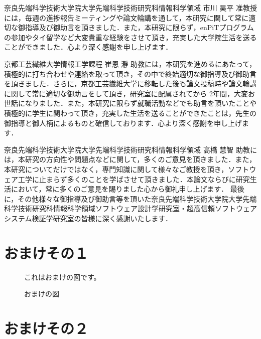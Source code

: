\documentclass[12pt]{jarticle} %
\begin{document}
奈良先端科学技術大学院大学先端科学技術研究科情報科学領域 市川 昊平 准教授には，毎週の進捗報告ミーティングや論文輪講を通して，本研究に関して常に適切な御指導及び御助言を頂きました．また，本研究に限らず，enPiTプログラムの参加やタイ留学など大変貴重な経験をさせて頂き，充実した大学院生活を送ることができました．心より深く感謝を申し上げます．

京都工芸繊維大学情報工学課程 崔恩 瀞 助教には，本研究を進めるにあたって，積極的に打ち合わせや連絡を取って頂き，その中で終始適切な御指導及び御助言を頂きました．さらに，京都工芸繊維大学に移転した後も論文投稿時や論文輪講に関して常に適切な御助言をして頂き，研究室に配属されてから 2年間，大変お世話になりました．また，本研究に限らず就職活動などでも助言を頂いたことや積極的に学生に関わって頂き，充実した生活を送ることができたことは，先生の御指導と御人柄によるものと確信しております．心より深く感謝を申し上げます．

奈良先端科学技術大学院大学先端科学技術研究科情報科学領域 高橋 慧智 助教には，本研究の方向性や問題点などに関して，多くのご意見を頂きました．また，本研究についてだけではなく，専門知識に関して様々なご教授を頂き，ソフトウェア工学に止まらず多くのことを学ばさせて頂きました．本論文ならびに研究生活において，常に多くのご意見を賜りました心から御礼申し上げます．
最後に，その他様々な御指導及び御助言等を頂いた奈良先端科学技術大学院大学先端科学技術研究科情報科学領域ソフトウェア設計学研究室・超高信頼ソフトウェアシステム検証学研究室の皆様に深く感謝いたします．


%
%
\newpage


%
%
\appendix

\section{おまけその１}
\label{omake1}



\begin{figure}
\centerline{これはおまけの図です。}
\caption{おまけの図}
\end{figure}


\section{おまけその２}
\end{document}
